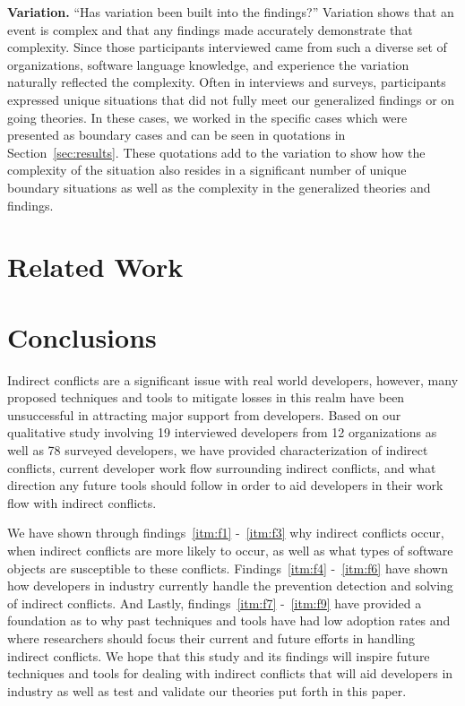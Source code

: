 \documentclass[conference]{IEEEtran}
\begin{document}
{\bfseries Variation.} ``Has variation been built into the findings?'' Variation shows that an event is complex and that any findings
made accurately demonstrate that complexity. Since those participants interviewed came from such a diverse set of organizations, 
software language knowledge, and experience the variation naturally reflected the complexity. Often in interviews and surveys, participants
expressed unique situations that did not fully meet our generalized findings or on going theories. In these cases, we worked in the specific
cases which were presented as boundary cases and can be seen in quotations in Section~\ref{sec:results}. These quotations add to the variation
to show how the complexity of the situation also resides in a significant number of unique boundary situations as well as the complexity
in the generalized theories and findings.

\section{Related Work}
\label{sec:related}

\section{Conclusions}
\label{sec:conc}

Indirect conflicts are a significant issue with real world developers, however, many proposed techniques and tools to mitigate
losses in this realm have been unsuccessful in attracting major support from developers. Based on our qualitative study involving
19 interviewed developers from 12 organizations as well as 78 surveyed developers, we have provided characterization of indirect conflicts,
current developer work flow surrounding indirect conflicts, and what direction any future tools should follow in order to aid developers
in their work flow with indirect conflicts.

We have shown through findings~\ref{itm:f1} -~\ref{itm:f3} why indirect conflicts occur, when indirect conflicts are more likely to
occur, as well as what types of software objects are susceptible to these conflicts. Findings~\ref{itm:f4} -~\ref{itm:f6} have shown
how developers in industry currently handle the prevention detection and solving of indirect conflicts. And Lastly, findings~\ref{itm:f7} 
-~\ref{itm:f9} have provided a foundation as to why past techniques and tools have had low adoption rates and where
researchers should focus their current and future efforts in handling indirect conflicts. We hope that this study and its 
findings will inspire future techniques and tools for dealing with indirect conflicts that 
will aid developers in industry as well as test and validate our theories put forth in this paper.
\end{document}
